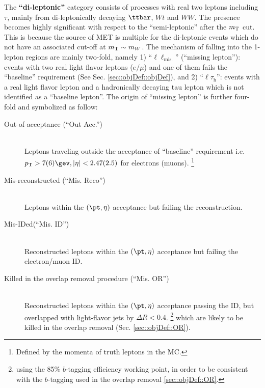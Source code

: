 The \textbf{``di-leptonic''} category consists of processes with real two leptons including $\tau$, mainly from di-leptonically decaying $\ttbar$, $Wt$ and $WW$. The presence becomes highly significant with respect to the ``semi-leptonic'' after the $m_{\mathrm{T}}$ cut. This is because the source of MET is multiple for the di-leptonic events which do not have an associated cut-off at $m_{\mathrm{T}} \sim m_{W}$. 
The mechanism of falling into the 1-lepton regions are mainly two-fold, namely 1) ``$\ell\ell_{\mathrm{mis.}}$'' (``missing lepton''): events with two real light flavor leptons ($e/\mu$) and one of them fails the ``baseline'' requirement (See Sec. \ref{sec::objDef::objDef}), and 2) ``$\ell\tau_{\mathrm{h}}$'': events with a real light flavor lepton and a hadronically decaying tau lepton which is not identified as a ``baseline lepton''. 
%
The origin of ``missing lepton'' is further four-fold and symbolized as follow: 
\begin{description}
\item [Out-of-acceptance (``Out Acc.'')] \mbox{} \\
 Leptons traveling outside the acceptance of ``baseline'' requirement i.e. $p_{\mathrm{T}}>7(6)\gev, |\eta|<2.47(2.5)$ for electrons (muons).
\footnote{Defined by the momenta of truth leptons in the MC.}
\item [Mis-reconstructed (``Mis. Reco'')] \mbox{} \\
 Leptons within the $(\pt,\eta)$ acceptance but failing the reconstruction.
\item [Mis-IDed(``Mis. ID'')] \mbox{} \\
 Reconstructed leptons within the $(\pt,\eta)$ acceptance but failing the electron/muon ID.
\item [Killed in the overlap removal procedure (``Mis. OR'')] \mbox{} \\
 Reconstructed leptons within the $(\pt,\eta)$ acceptance passing the ID, but overlapped with light-flavor jets by $\Delta R<0.4$.
\footnote{using the 85$\%$ $b$-tagging efficiency working point, in order to be consistent with the $b$-tagging used in the overlap removal \ref{sec::objDef::OR}. }
which are likely to be killed in the overlap removal (Sec. \ref{sec::objDef::OR}). 
\end{description}

